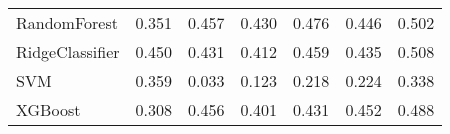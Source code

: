 \begin{tabular}{lllllll}
                   RandomForest & 0.351 &                     0.457 &                 0.430 &                  0.476 &                                   0.446 &     0.502 \\
                RidgeClassifier & 0.450 &                     0.431 &                 0.412 &                  0.459 &                                   0.435 &     0.508 \\
                            SVM & 0.359 &                     0.033 &                 0.123 &                  0.218 &                                   0.224 &     0.338 \\
                        XGBoost & 0.308 &                     0.456 &                 0.401 &                  0.431 &                                   0.452 &     0.488 \\
\bottomrule
\end{tabular}
